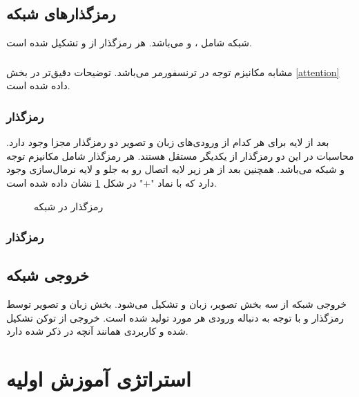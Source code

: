 \subsection{رمزگذارهای شبکه}
شبکه
شامل
،
و
می‌باشد. هر رمزگذار از 
و 
تشکیل شده است.

\subsubsection{}
مشابه مکانیزم توجه
در ترنسفورمر می‌باشد. توضیحات دقیق‌تر در بخش \ref{attention} داده شده است.

\subsubsection{رمزگذار
	}
بعد از لایه 
برای هر کدام از ورودی‌های زبان و تصویر دو رمزگذار
مجزا وجود دارد. محاسبات در این دو رمزگذار از یکدیگر مستقل هستند. هر رمزگذار شامل مکانیزم توجه
و شبکه 
می‌باشد. همچنین بعد از هر زیر لایه اتصال رو به جلو
و لایه نرمال‌سازی
 وجود دارد که با نماد "+" در شکل
\ref{lxmert-single-encoder}
 نشان داده شده است.

\begin{figure}[H]
	\caption{رمزگذار 
		در شبکه
		 \cite{tan2019lxmert}}
	\label{lxmert-single-encoder}
\end{figure}
\subsubsection{رمزگذار
	}

\subsection{خروجی شبکه}
خروجی شبکه
از سه بخش تصویر، زبان و 
تشکیل می‌شود. بخش زبان و تصویر توسط رمزگذار
و با توجه به دنباله ورودی هر مورد تولید شده است. خروجی 
از توکن 
تشکیل شده و کاربردی همانند آنچه در 
ذکر شده دارد.
\section{استراتژی آموزش اولیه 
}
